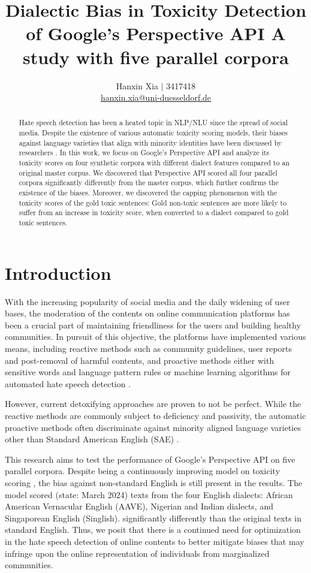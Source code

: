 \documentclass[11pt]{article}
\title{Dialectic Bias in Toxicity Detection of Google's Perspective API
\bigbreak A study with five parallel corpora}
\author{Hanxin Xia $\vert$ 3417418\\
  \href{mailto://hanxin.xia@uni-duesseldorf.de}{hanxin.xia@uni-duesseldorf.de}}
\begin{document}
\maketitle

\begin{abstract}
Hate speech detection has been a heated topic in NLP/NLU since the spread of social media. Despite the existence of various automatic toxicity scoring models, their biases against language varieties that align with minority identities have been discussed by researchers \citep{sap-etal-2019-risk}. In this work, we focus on Google's Perspective API and analyze its toxicity scores on four synthetic corpora with different dialect features compared to an original master corpus. We discovered that Perspective API scored all four parallel corpora significantly differently from the master corpus, which further confirms the existence of the biases. Moreover, we discovered the capping phenomenon with the toxicity scores of the gold toxic sentences: Gold non-toxic sentences are more likely to suffer from an increase in toxicity score, when converted to a dialect compared to gold toxic sentences.
\end{abstract}


\section{Introduction}

With the increasing popularity of social media and the daily widening of user bases, the moderation of the contents on online communication platforms has been a crucial part of maintaining friendliness for the users and building healthy communities. In pursuit of this objective, the platforms have implemented various means, including reactive methods such as community guidelines, user reports and post-removal of harmful contents, and proactive methods either with sensitive words and language pattern rules \citep{gitari-2015-lexicon} or machine learning algorithms for automated hate speech detection \citep{alrehili-2019-survey}.

However, current detoxifying approaches are proven to not be perfect. While the reactive methods are commonly subject to deficiency and passivity, the automatic proactive methods often discriminate against minority aligned language varieties other than Standard American English (SAE) \citep{sap-etal-2019-risk, zhou-etal-2021-challenges}.

This research aims to test the performance of Google’s Perspective API on five parallel corpora. Despite being a continuously improving model on toxicity scoring \citep{google-perspective}, the bias against non-standard English is still present in the results. The model scored (state: March 2024) texts from the four English dialects: African American Vernacular English (AAVE), Nigerian and Indian dialects, and Singaporean English (Singlish). significantly differently than the original texts in standard English. Thus, we posit that there is a continued need for optimization in the hate speech detection of online contents to better mitigate biases that may infringe upon the online representation of individuals from marginalized communities.
\end{document}
